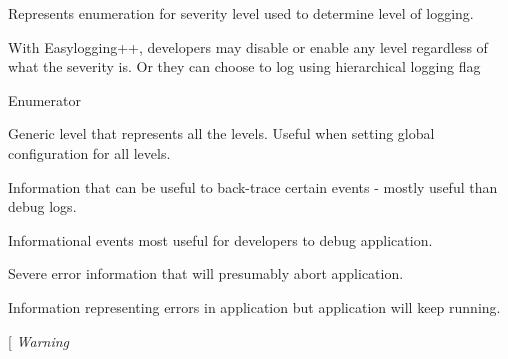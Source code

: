 Represents enumeration for severity level used to determine level of logging. 

With Easylogging++, developers may disable or enable any level regardless of what the severity is. Or they can choose to log using hierarchical logging flag \begin{Desc}
\item[Enumerator]\par
\begin{description}
\item[{\em 
\hypertarget{namespaceel_ab0ac6091262344c52dd2d3ad099e8e36a4cc6684df7b4a92b1dec6fce3264fac8}{}Global\label{namespaceel_ab0ac6091262344c52dd2d3ad099e8e36a4cc6684df7b4a92b1dec6fce3264fac8}
}]Generic level that represents all the levels. Useful when setting global configuration for all levels. \item[{\em 
\hypertarget{namespaceel_ab0ac6091262344c52dd2d3ad099e8e36add4ec0ac4e58f7c32a01244ae91150b1}{}Trace\label{namespaceel_ab0ac6091262344c52dd2d3ad099e8e36add4ec0ac4e58f7c32a01244ae91150b1}
}]Information that can be useful to back-\/trace certain events -\/ mostly useful than debug logs. \item[{\em 
\hypertarget{namespaceel_ab0ac6091262344c52dd2d3ad099e8e36aa603905470e2a5b8c13e96b579ef0dba}{}Debug\label{namespaceel_ab0ac6091262344c52dd2d3ad099e8e36aa603905470e2a5b8c13e96b579ef0dba}
}]Informational events most useful for developers to debug application. \item[{\em 
\hypertarget{namespaceel_ab0ac6091262344c52dd2d3ad099e8e36a882384ec38ce8d9582b57e70861730e4}{}Fatal\label{namespaceel_ab0ac6091262344c52dd2d3ad099e8e36a882384ec38ce8d9582b57e70861730e4}
}]Severe error information that will presumably abort application. \item[{\em 
\hypertarget{namespaceel_ab0ac6091262344c52dd2d3ad099e8e36a902b0d55fddef6f8d651fe1035b7d4bd}{}Error\label{namespaceel_ab0ac6091262344c52dd2d3ad099e8e36a902b0d55fddef6f8d651fe1035b7d4bd}
}]Information representing errors in application but application will keep running. \item[{\em 
\hypertarget{namespaceel_ab0ac6091262344c52dd2d3ad099e8e36a0eaadb4fcb48a0a0ed7bc9868be9fbaa}{}Warning\label{namespaceel_ab0ac6091262344c52dd2d3ad099e8e36a0eaadb4fcb48a0a0ed7bc9868be9fbaa}
}
\end{description}
\end{Desc}
